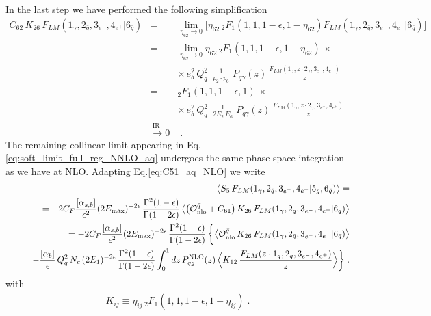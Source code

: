 \documentclass[12pt,a4paper]{article}
\newcommand{\nn}{\nonumber}
\newcommand{\eps}{\epsilon}
\newcommand{\beq}{\begin{eqnarray}}
\newcommand{\eeq}{\end{eqnarray}}
\newcommand{\barq}{{\bar{q}}}
\begin{document}
In the last step we have performed the following simplification
\beq
C_{62}  \, K_{26} \, 
F_{LM}(1_\gamma,2_{\bar{q}},3_{e^-},4_{e^+} | 6_{\bar{q}})
&=&
\lim_{\eta_{62} \rightarrow 0}
\Big[
\eta_{62} \, {}_2F_1 (1, 1, 1-\eps, 1-\eta_{62})
F_{LM}(1_\gamma,2_{\bar{q}},3_{e^-},4_{e^+} | 6_{\bar{q}})
\Big]
\nn \\
&=&
\lim_{\eta_{62} \rightarrow 0}
 \eta_{62} \, {}_2F_1 (1, 1, 1-\eps, 1-\eta_{62}) \, \times
 \nn \\
 && \times \, 
  e^2_{b} \, Q_q^2\,   \; \frac{1}{p_2\cdot p_6} \; 
P_{q\gamma}(z)  \, \frac{F_{LM}(1_{\gamma},z\cdot2_{\gamma},3_{e^-},4_{e^+})}{z} 
\nn \\
&=&
 {}_2F_1 (1, 1, 1-\eps, 1) \, \times
 \nn \\
 && \times \, 
  e^2_{b} \, Q_q^2\,   \; \frac{1}{2 E_2 \, E_6} \; 
P_{q\gamma}(z)  \, \frac{F_{LM}(1_{\gamma},z\cdot2_{\gamma},3_{e^-},4_{e^+})}{z} 
\nn \\
&\overset{\text{ IR sub.}}{\longrightarrow 0}& \; .
\eeq
 The remaining collinear limit appearing in Eq.\eqref{eq:soft_limit_full_reg_NNLO_aq} undergoes the same phase space integration as we have at NLO. Adapting Eq.\eqref{eq:C51_aq_NLO} we write
 \beq
&&
\hspace{-7mm}
\big\langle S_{5} \, F_{LM}(1_\gamma,2_{\bar{q}},3_{e^-},4_{e^+} |5_g, 6_{\bar{q}})\big\rangle 
=
\nn\\
&& =
-
2 C_F \frac{[\alpha_{s,b}]}{\eps^2} 
(2 E_{\rm max})^{-2\eps} \, 
\frac{\Gamma^2(1-\eps)}{\Gamma(1-2\eps)} \, 
\big \langle 
\big( \mathcal{O}^{\barq}_{\rm nlo} 
+
C_{61}  
\big)
\, 
K_{26} \, 
F_{LM}(1_\gamma,2_{\bar{q}},3_{e^-},4_{e^+} | 6_{\bar{q}})
\big \rangle
\nn \\
&& =
-
2 C_F \frac{[\alpha_{s,b}]}{\eps^2} 
(2 E_{\rm max})^{-2\eps} \, 
\frac{\Gamma^2(1-\eps)}{\Gamma(1-2\eps)} \, 
\bigg\{
\big \langle 
\mathcal{O}^{\barq}_{\rm nlo} \, 
K_{26} \, 
F_{LM}(1_\gamma,2_{\bar{q}},3_{e^-},4_{e^+} | 6_{\bar{q}})
\big \rangle
 \\
&& \qquad 
-\frac{[\alpha_{b}]}{\eps}\, Q_q^2 \, N_c \, (2E_1)^{-2\eps} \, 
\frac{\Gamma^2(1-\eps)}{\Gamma(1-2\eps)} 
\int_{0}^1 dz \, 
P_{\barq g}^{\rm NLO} (z) \, 
\Big\langle
 K_{12} \, \frac{F_{LM}(z\cdot 1_{q},2_{\bar{q}},3_{e^-},4_{e^+})}{z} \Big\rangle
 \bigg\}
 \; .
 \nn 
\eeq
 with 
\beq
K_{ij} 
 \equiv 
\eta_{ij} \, {}_2F_1 (1, 1, 1-\eps, 1-\eta_{ij}) \; .
\eeq
 
\end{document}
